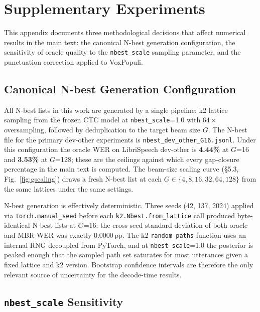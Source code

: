 \section{Supplementary Experiments}

This appendix documents three methodological decisions that affect numerical results in the main
text: the canonical N-best generation configuration, the sensitivity of oracle quality to the
\texttt{nbest\_scale} sampling parameter, and the punctuation correction applied to VoxPopuli.



\subsection{Canonical N-best Generation Configuration}

All N-best lists in this work are generated by a single pipeline: k2 lattice sampling
\citep{li2022k2} from the frozen CTC model at \texttt{nbest\_scale}=1.0 with $64\times$
oversampling, followed by deduplication to the target beam size $G$. The N-best file for the
primary dev-other experiments is \texttt{nbest\_dev\_other\_G16.jsonl}. Under this configuration
the oracle WER on LibriSpeech dev-other is \textbf{4.44\%} at $G$=16 and \textbf{3.53\%} at
$G$=128; these are the ceilings against which every gap-closure percentage in the main text is
computed. The beam-size scaling curve (§5.3, Fig.~\ref{fig:gscaling}) draws a fresh N-best list
at each $G \in \{4, 8, 16, 32, 64, 128\}$ from the same lattices under the same settings.

N-best generation is effectively deterministic. Three seeds (42, 137, 2024) applied via
\texttt{torch.manual\_seed} before each \texttt{k2.Nbest.from\_lattice} call produced
byte-identical N-best lists at $G$=16: the cross-seed standard deviation of both oracle and MBR
WER was exactly 0.0000\,pp. The k2 \texttt{random\_paths} function uses an internal RNG decoupled
from PyTorch, and at \texttt{nbest\_scale}=1.0 the posterior is peaked enough that the sampled
path set saturates for most utterances given a fixed lattice and k2 version. Bootstrap confidence
intervals are therefore the only relevant source of uncertainty for the decode-time results.



\subsection{\texttt{nbest\_scale} Sensitivity}

